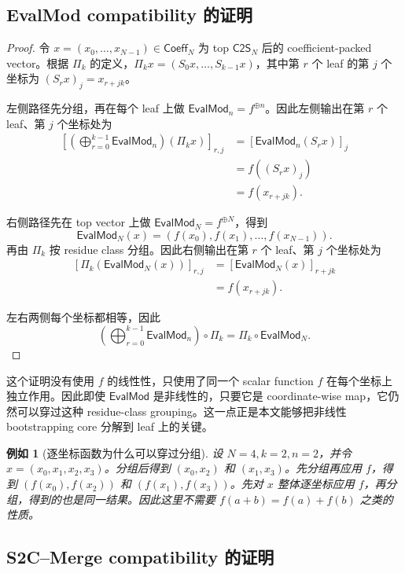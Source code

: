 \documentclass[UTF8,11pt]{article}
\newcommand{\CtwoS}{\mathsf{C2S}}
\newcommand{\EvalMod}{\mathsf{EvalMod}}
\theoremstyle{definition}
\theoremstyle{plain}
\newtheorem{example}{例如}
\begin{document}
\subsection{EvalMod compatibility 的证明}
\label{subsec:proof-evalmod}

\begin{proof}
令 \(x=(x_0,\ldots,x_{N-1})\in\mathsf{Coeff}_N\) 为 top \(\CtwoS_N\) 后的 coefficient-packed vector。根据 \(\Pi_k\) 的定义，\(\Pi_kx=(S_0x,\ldots,S_{k-1}x)\)，其中第 \(r\) 个 leaf 的第 \(j\) 个坐标为 \((S_rx)_j=x_{r+jk}\)。

左侧路径先分组，再在每个 leaf 上做 \(\EvalMod_n=f^{\oplus n}\)。因此左侧输出在第 \(r\) 个 leaf、第 \(j\) 个坐标处为
\[
\begin{aligned}
\left[
\left(\bigoplus_{r=0}^{k-1}\EvalMod_n\right)(\Pi_kx)
\right]_{r,j}
&=
\left[\EvalMod_n(S_rx)\right]_j\\
&=
f((S_rx)_j)\\
&=
f(x_{r+jk}).
\end{aligned}
\]

右侧路径先在 top vector 上做 \(\EvalMod_N=f^{\oplus N}\)，得到
\[
\EvalMod_N(x)=(f(x_0),f(x_1),\ldots,f(x_{N-1})).
\]
再由 \(\Pi_k\) 按 residue class 分组。因此右侧输出在第 \(r\) 个 leaf、第 \(j\) 个坐标处为
\[
\begin{aligned}
\left[
\Pi_k(\EvalMod_N(x))
\right]_{r,j}
&=
\left[\EvalMod_N(x)\right]_{r+jk}\\
&=
f(x_{r+jk}).
\end{aligned}
\]

左右两侧每个坐标都相等，因此
\[
\left(\bigoplus_{r=0}^{k-1}\EvalMod_n\right)\circ\Pi_k
=
\Pi_k\circ\EvalMod_N.
\]
\end{proof}

这个证明没有使用 \(f\) 的线性性，只使用了同一个 scalar function \(f\) 在每个坐标上独立作用。因此即使 \(\EvalMod\) 是非线性的，只要它是 coordinate-wise map，它仍然可以穿过这种 residue-class grouping。这一点正是本文能够把非线性 bootstrapping core 分解到 leaf 上的关键。

\begin{example}[逐坐标函数为什么可以穿过分组]
设 \(N=4,k=2,n=2\)，并令 \(x=(x_0,x_1,x_2,x_3)\)。分组后得到 \((x_0,x_2)\) 和 \((x_1,x_3)\)。先分组再应用 \(f\)，得到 \((f(x_0),f(x_2))\) 和 \((f(x_1),f(x_3))\)。先对 \(x\) 整体逐坐标应用 \(f\)，再分组，得到的也是同一结果。因此这里不需要 \(f(a+b)=f(a)+f(b)\) 之类的性质。
\end{example}

\subsection{S2C--Merge compatibility 的证明}
\label{subsec:proof-s2c-merge}
\end{document}
